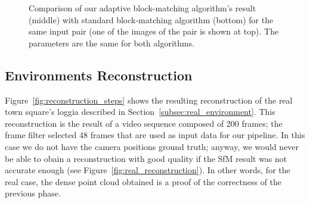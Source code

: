 \begin{figure}[h]
\begin{subfigure}{0.6\linewidth}
	\end{subfigure}
\caption{Comparison of our adaptive block-matching algorithm's result (middle) with
standard block-matching algorithm (bottom) for the same input pair (one of the
images of the pair is shown at top). The parameters are the same for
both algorithms.}
\label{fig:disparity_comparison}
\end{figure}
%
\subsection{Environments Reconstruction}
Figure~\ref{fig:reconstruction_steps} shows the resulting reconstruction of the
real town square's loggia described in Section~\ref{subsec:real_environment}.
This reconstruction is the result of a video sequence composed of 200 frames;
the frame filter selected 48 frames that are used as input data for our
pipeline.
In this case we do not have the camera positions ground truth; anyway, we
would never be able to obain a reconstruction with good quality
if the SfM result was not accurate enough (see Figure~\ref{fig:real_reconstruction}). In other words, for the real case, the dense point
cloud obtained is a proof of the correctness of the previous phase.
%
